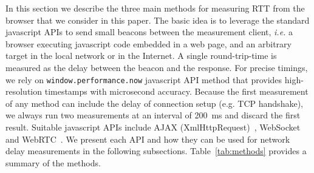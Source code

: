 \documentclass[12pt,twoside]{book}
\begin{document}
In this section we describe the three main methods for measuring RTT from the browser that we consider in this paper. The basic idea is to leverage the standard javascript APIs to send small beacons between the measurement client, \emph{i.e.} a browser executing javascript code embedded in a web page, and an arbitrary target in the local network or in the Internet. A single round-trip-time is measured as the delay between the beacon and the response. For precise timings, we rely on \texttt{window.performance.now} javascript API method that provides high-resolution timestamps with microsecond accuracy. Because the first measurement of any method can include the delay of connection setup (e.g. TCP handshake), we always run two measurements at an interval of 200~ms and discard the first result.
%
Suitable javascript APIs  include AJAX (XmlHttpRequest)~\cite{xmlhttpreq}, WebSocket~\cite{websocket} and WebRTC~\cite{webrtc}. We present each API and how they can be used for network delay measurements in the following subsections. 
Table~\ref{tab:methods} provides a summary of the methods. %

\begin{table}[bt]
\
\noindent{}
\caption {Delay measurement methods overview.} 
\label{tab:methods}
\end{table}
\end{document}
